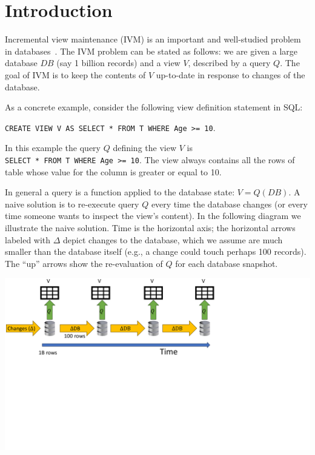 \section{Introduction}\label{sec:introduction}

Incremental view maintenance (IVM) is an important and well-studied
problem in databases~\cite{gupta-idb95}.  The IVM problem can be
stated as follows: we are given a large database $DB$ (say 1 billion
records) and a view $V$, described by a query $Q$.  The goal of IVM is
to keep the contents of $V$ up-to-date in response to changes of the
database.

As a concrete example, consider the following view definition
statement in SQL:

\texttt{CREATE VIEW V AS SELECT * FROM T WHERE Age >= 10}.

In this example the query $Q$ defining the view $V$ is
\\ \texttt{SELECT * FROM T WHERE Age >= 10}.  The view  always
contains all the rows of table  whose value for the column
 is greater or equal to 10.

In general a query is a function applied to the database state: $V =
Q(DB)$.  A naive solution is to re-execute query $Q$ every time the
database changes (or every time someone wants to inspect the view's
content).  In the following diagram we illustrate the naive solution.
Time is the horizontal axis; the horizontal arrows labeled with
$\Delta$ depict changes to the database, which we assume are much
smaller than the database itself (e.g., a change could touch perhaps
100 records).  The ``up'' arrows show the re-evaluation of $Q$ for
each database snapshot.

\includegraphics[trim={0 3.8in 4in 0},clip,scale=.3]{view.pdf}


